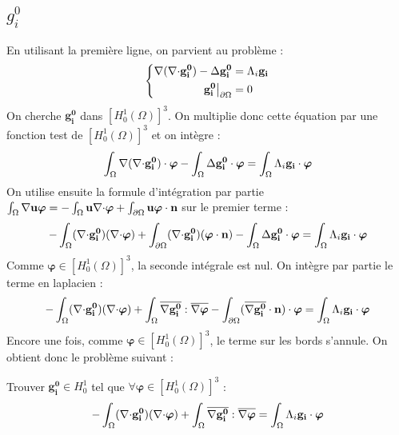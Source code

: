 \subsection{$g_i^0$}
En utilisant la première ligne, on parvient au problème :
\begin{equation*}
\left\{\begin{aligned}
{\nabla}({\nabla\cdot} \mathbf{g_i^0})-{\Delta} \mathbf{g_i^0} &= \Lambda_i\mathbf{g_i}\\
\mathbf{g_i^0}{\big\rvert_{\partial\Omega}} &= 0
\end{aligned}\right.
\end{equation*}
On cherche $\mathbf{g_i^0}$ dans $[H^1_0(\Omega)]^3$. On multiplie donc cette équation par une fonction test de $[H^1_0(\Omega)]^3$ et on intègre :
\[ \int_\Omega {\nabla}({\nabla\cdot} \mathbf{g_i^0})\cdot\bm{\varphi} - \int_\Omega {\Delta} \mathbf{g_i^0}\cdot\bm{\varphi} = \int_\Omega \Lambda_i\mathbf{g_i}\cdot\bm{\varphi} \]
On utilise ensuite la formule d'intégration par partie $\int_\Omega {\nabla}{\mathbf{u}}\bm{\varphi} = -\int_\Omega \mathbf{u}{\nabla\cdot}\bm{\varphi} + \int_{\partial\Omega} \mathbf{u}\bm{\varphi}\cdot \mathbf{n}$ sur le premier terme :
\[ -\int_\Omega ({\nabla\cdot} \mathbf{g_i^0})({\nabla\cdot}\bm{\varphi}) + \int_{\partial\Omega} ({\nabla\cdot} \mathbf{g_i^0})(\bm{\varphi}\cdot \mathbf{n}) - \int_\Omega {\Delta} \mathbf{g_i^0}\cdot\bm{\varphi} = \int_\Omega \Lambda_i\mathbf{g_i}\cdot\bm{\varphi} \]
Comme $\bm{\varphi}\in [H^1_0(\Omega)]^3$, la seconde intégrale est nul. On intègre par partie le terme en laplacien :
\[ -\int_\Omega ({\nabla\cdot} \mathbf{g_i^0})({\nabla\cdot}\bm{\varphi}) + \int_\Omega \overline{{\nabla} \mathbf{g_i^0}}:\overline{{\nabla}\bm{\varphi}} - \int_{\partial\Omega} (\overline{{\nabla} \mathbf{g_i^0}}\cdot \mathbf{n})\cdot\bm{\varphi} = \int_\Omega \Lambda_i\mathbf{g_i}\cdot\bm{\varphi} \]
Encore une fois, comme $\bm{\varphi}\in [H^1_0(\Omega)]^3$, le terme sur les bords s'annule. On obtient donc le problème suivant :
\begin{pb}\label{fvgi0}
Trouver $\mathbf{g_i^0}\in H^1_0$ tel que $\forall \bm{\varphi}\in [H^1_0(\Omega)]^3$ :
\begin{equation*}
-\int_\Omega ({\nabla\cdot} \mathbf{g_i^0})({\nabla\cdot}\bm{\varphi}) + \int_\Omega \overline{{\nabla} \mathbf{g_i^0}}:\overline{{\nabla}\bm{\varphi}} = \int_\Omega \Lambda_i\mathbf{g_i}\cdot\bm{\varphi}
\end{equation*}\end{pb}


